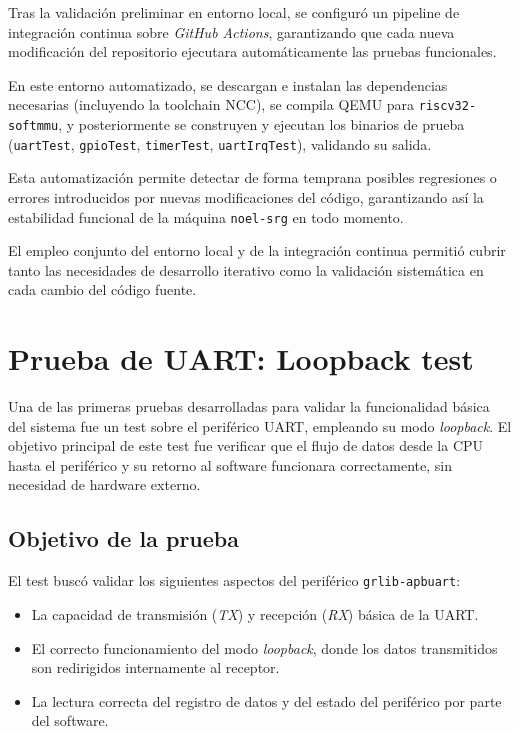 Tras la validación preliminar en entorno local, se configuró un pipeline de integración continua sobre \emph{GitHub Actions}, garantizando que cada nueva modificación del repositorio ejecutara automáticamente las pruebas funcionales.

En este entorno automatizado, se descargan e instalan las dependencias necesarias (incluyendo la toolchain NCC), se compila QEMU para \texttt{riscv32-softmmu}, y posteriormente se construyen y ejecutan los binarios de prueba (\texttt{uartTest}, \texttt{gpioTest}, \texttt{timerTest}, \texttt{uartIrqTest}), validando su salida.

Esta automatización permite detectar de forma temprana posibles regresiones o errores introducidos por nuevas modificaciones del código, garantizando así la estabilidad funcional de la máquina \texttt{noel-srg} en todo momento.

\vspace{1em}
El empleo conjunto del entorno local y de la integración continua permitió cubrir tanto las necesidades de desarrollo iterativo como la validación sistemática en cada cambio del código fuente.

\section{Prueba de UART: Loopback test}
\label{subsec:uart-loopback}

Una de las primeras pruebas desarrolladas para validar la funcionalidad básica del sistema fue un test sobre el periférico UART, empleando su modo \emph{loopback}. El objetivo principal de este test fue verificar que el flujo de datos desde la CPU hasta el periférico y su retorno al software funcionara correctamente, sin necesidad de hardware externo.

\subsection*{Objetivo de la prueba}

El test buscó validar los siguientes aspectos del periférico \texttt{grlib-apbuart}:

\begin{itemize}
    \item La capacidad de transmisión (\emph{TX}) y recepción (\emph{RX}) básica de la UART.
    \item El correcto funcionamiento del modo \emph{loopback}, donde los datos transmitidos son redirigidos internamente al receptor.
    \item La lectura correcta del registro de datos y del estado del periférico por parte del software.
\end{itemize}

